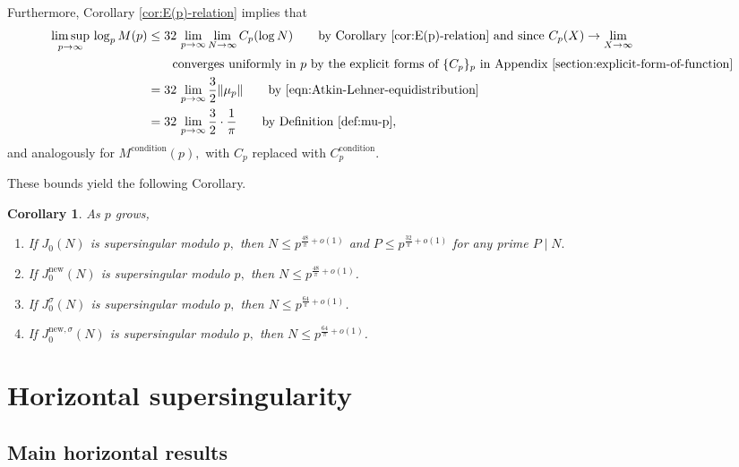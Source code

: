 \documentclass[11pt,letterpaper,reqno]{amsart}
\newtheorem{corollary}[theorem]{Corollary}
\theoremstyle{definition}
\numberwithin{equation}{section}
\numberwithin{figure}{section}
\numberwithin{table}{section}
\let\subsectiontemp\subsection
\renewcommand{\subsection}[1]{ 
    \subsectiontemp{#1} \hfill\vspace{0.5\linespacing} 
}
\newcommand{\nw}{\mathrm{new}}
\begin{document}
Furthermore, Corollary \ref{cor:E(p)-relation} implies that
\begin{align}
    \limsup_{p \rightarrow \infty} \, \log_pM(p) &\leq 32 \, \lim_{p \rightarrow \infty} \lim_{N \rightarrow \infty} C_p(\log N) \qquad \text{by Corollary \ref{cor:E(p)-relation} and since $C_p(X) \rightarrow \lim_{X \rightarrow \infty}$}\\
    &\qquad \text{converges uniformly in $p$ by the explicit forms of $\{C_p\}_p$ in Appendix \ref{section:explicit-form-of-function}}\\
    &= 32 \, \lim_{p \rightarrow \infty} \frac{3}{2} \| \mu_p \| \qquad \text{by \eqref{eqn:Atkin-Lehner-equidistribution}}\\
    &= 32 \, \lim_{p \rightarrow \infty} \frac{3}{2} \cdot \frac{1}{\pi} \qquad \text{by Definition \ref{def:mu-p}},
\end{align}
and analogously for $M^{\text{condition}}(p),$ with $C_p$ replaced with $C_p^{\text{condition}}$. 


These bounds yield the following Corollary.
\begin{corollary} \label{cor:vertical-suprsingularity-with explicit exponent}
    As $p$ grows, 
    \begin{enumerate}
        \item If $J_0(N)$ is supersingular modulo $p,$ then $N \leq p^{\frac{48}{\pi} + o(1)}$ and $P \leq p^{\frac{32}{\pi} + o(1)}$ for any prime $P \mid N.$
        \item If $J_0^\nw(N)$ is supersingular modulo $p,$ then $N \leq p^{\frac{48}{\pi} + o(1)}$.
    \item If $J_0^\sigma(N)$ is supersingular modulo $p,$ then $N \leq p^{\frac{64}{\pi} + o(1)}$. 
    \item If $J_0^{\nw,\sigma}(N)$ is supersingular modulo $p,$ then $N \leq p^{\frac{64}{\pi} + o(1)}$.
    \end{enumerate}
\end{corollary}




\section{Horizontal supersingularity}\label{section:horizontal}

\subsection{Main horizontal results}
\end{document}
